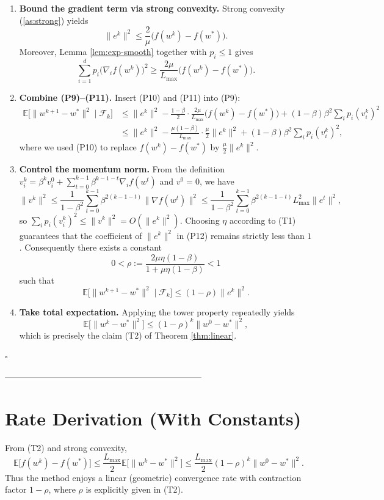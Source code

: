 \documentclass{article}
\newcommand{\E}{\mathbb{E}}
\begin{document}
\begin{enumerate}[label=[Step \arabic*], leftmargin=*]
\item \textbf{Bound the gradient term via strong convexity.}  
Strong convexity (\ref{as:strong}) yields
\[
\|e^{k}\|^{2}\le \frac{2}{\mu}\bigl(f(w^{k})-f(w^{*})\bigr).
\tag{P10}
\]
Moreover, Lemma \ref{lem:exp-smooth} together with $p_i\le 1$ gives
\[
\sum_{i=1}^{d}p_i\bigl(\nabla_i f(w^{k})\bigr)^{2}
\ge \frac{2\mu}{L_{\max}}\bigl(f(w^{k})-f(w^{*})\bigr).
\tag{P11}
\]

\item \textbf{Combine (P9)–(P11).}  
Insert (P10) and (P11) into (P9):
\[
\begin{aligned}
\E\!\bigl[\|w^{k+1}-w^{*}\|^{2}\mid\mathcal{F}_{k}\bigr]
&\le \|e^{k}\|^{2}
-\frac{1-\beta}{2}\cdot\frac{2\mu}{L_{\max}}\bigl(f(w^{k})-f(w^{*})\bigr)
+(1-\beta)\beta^{2}\sum_{i}p_i(v_{i}^{k})^{2}\\
&\le \|e^{k}\|^{2}
-\frac{\mu(1-\beta)}{L_{\max}}\cdot\frac{\mu}{2}\|e^{k}\|^{2}
+(1-\beta)\beta^{2}\sum_{i}p_i(v_{i}^{k})^{2},
\end{aligned}
\tag{P12}
\]
where we used (P10) to replace $f(w^{k})-f(w^{*})$ by $\frac{\mu}{2}\|e^{k}\|^{2}$.

\item \textbf{Control the momentum norm.}  
From the definition $v_{i}^{k}= \beta^{k}v_{i}^{0}
+\sum_{t=0}^{k-1}\beta^{k-1-t}\nabla_i f(w^{t})$ and $v^{0}=0$, we have
\[
\|v^{k}\|^{2}\le \frac{1}{1-\beta^{2}}\sum_{t=0}^{k-1}\beta^{2(k-1-t)}\|\nabla f(w^{t})\|^{2}
\le \frac{1}{1-\beta^{2}}\sum_{t=0}^{k-1}\beta^{2(k-1-t)}L_{\max}^{2}\|e^{t}\|^{2},
\]
so $\sum_{i}p_i(v_{i}^{k})^{2}\le \|v^{k}\|^{2}=O(\|e^{k}\|^{2})$.
Choosing $\eta$ according to (T1) guarantees that the coefficient of
$\|e^{k}\|^{2}$ in (P12) remains strictly less than $1$.
Consequently there exists a constant
\[
0<\rho:=\frac{2\mu\eta(1-\beta)}{1+\mu\eta(1-\beta)}<1
\]
such that
\[
\E\!\bigl[\|w^{k+1}-w^{*}\|^{2}\mid\mathcal{F}_{k}\bigr]\le (1-\rho)\|e^{k}\|^{2}.
\tag{P13}
\]

\item \textbf{Take total expectation.}  
Applying the tower property repeatedly yields
\[
\E\!\bigl[\|w^{k}-w^{*}\|^{2}\bigr]\le (1-\rho)^{k}\|w^{0}-w^{*}\|^{2},
\]
which is precisely the claim (T2) of Theorem \ref{thm:linear}.
\end{enumerate}
\hfill $\square$

---------------------------------------------------------------------

\section*{Rate Derivation (With Constants)}
From (T2) and strong convexity,
\[
\E\!\bigl[f(w^{k})-f(w^{*})\bigr]
\le \frac{L_{\max}}{2}\E\!\bigl[\|w^{k}-w^{*}\|^{2}\bigr]
\le \frac{L_{\max}}{2}(1-\rho)^{k}\|w^{0}-w^{*}\|^{2}.
\]
Thus the method enjoys a linear (geometric) convergence rate with contraction
factor $1-\rho$, where $\rho$ is explicitly given in (T2).
\end{document}
